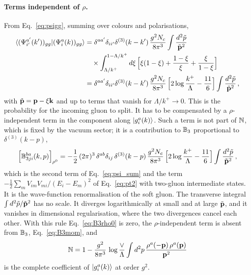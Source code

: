 \paragraph{Terms independent of $\rho$.} From Eq.~\eqref{eq:psigg}, summing over colours and polarisations,
\begin{align}\label{eq:ov5}
\braket{(\Psi^{a'}_{i'}(k'))_{gg}|(\Psi^a_i(k))_{gg}}&=\delta^{aa'}\delta_{ii'}\delta^{(3)}(k-k')\,\frac{g^2N_c}{8\pi^3}\int\frac{d^2\tilde p}{\tilde{\mathbf{p}}^2}\notag\\
&\quad\times\int_{\Lambda/k^+}^{1-\Lambda/k^+}d\xi\,\Big[\xi(1-\xi)+\frac{1-\xi}{\xi}+\frac{\xi}{1-\xi}\Big]\notag\\
&=\delta^{aa'}\delta_{ii'}\delta^{(3)}(k-k')\,\frac{g^2N_c}{8\pi^3}\,\Big[2\log\frac{k^+}{\Lambda}-\frac{11}{6}\Big]\int\frac{d^2\tilde p}{\tilde{\mathbf{p}}^2}\,,
\end{align}
with $\tilde{\mathbf{p}}=\mathbf{p}-\xi\mathbf{k}$ and up to terms that vanish for $\Lambda/k^+\to0$. This is the probability for the incoming gluon to split. It has to be compensated by a $\rho$-independent term in the component along $\ket{g^a_i(k)}$. Such a term is not part of $\mathbb{N}$, which is fixed by the vacuum sector; it is a contribution to $\mathbb{B}_3$ proportional to $\delta^{(3)}(k-p)$,
\begin{align}\label{eq:B3rho0}
\Big[\mathbb{B}^{ba}_{3ji}(k,p)\Big]_{\rho^0}=-\frac12\,(2\pi)^3\,\delta^{ab}\delta_{ij}\,\delta^{(3)}(k-p)\,\frac{g^2N_c}{8\pi^3}\,\Big[2\log\frac{k^+}{\Lambda}-\frac{11}{6}\Big]\int\frac{d^2\tilde p}{\tilde{\mathbf{p}}^2}\,,
\end{align}
which is the second term of Eq.~\eqref{eq:psi_sum} and the term $-\frac12\sum_mV_{im}V_{mi}/(E_i-E_m)^2$ of Eq.~\eqref{eq:pt2} with two-gluon intermediate states. It is the wave-function renormalisation of the soft gluon. The transverse integral $\int d^2\tilde p/\tilde{\mathbf{p}}^2$ has no scale. It diverges logarithmically at small and at large $\tilde{\mathbf{p}}$, and it vanishes in dimensional regularisation, where the two divergences cancel each other. With this rule Eq.~\eqref{eq:B3rho0} is zero, the $\rho$-independent term is absent from $\mathbb{B}_3$, Eq.~\eqref{eq:B3mom}, and
\begin{align}\label{eq:Nresult}
\mathbb{N}=1-\frac{g^2}{8\pi^3}\,\log\frac{\vee}{\Lambda}\int d^2p\,\frac{\rho^a(-\mathbf{p})\,\rho^a(\mathbf{p})}{\mathbf{p}^2}
\end{align}
is the complete coefficient of $\ket{g^a_i(k)}$ at order $g^2$.
